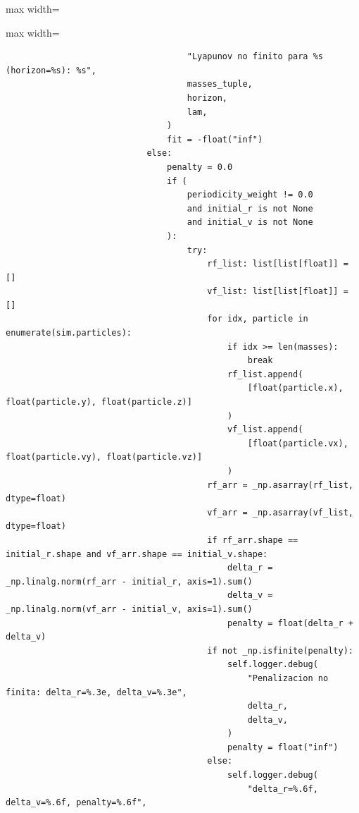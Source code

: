 \begin{listing}[H]
\begin{adjustbox}{max width=\textwidth}
\begin{minipage}{\linewidth}
{\begin{adjustbox}{max width=\textwidth}
\begin{minipage}{\textwidth}
\begin{verbatim}
                                    "Lyapunov no finito para %s (horizon=%s): %s",
                                    masses_tuple,
                                    horizon,
                                    lam,
                                )
                                fit = -float("inf")
                            else:
                                penalty = 0.0
                                if (
                                    periodicity_weight != 0.0
                                    and initial_r is not None
                                    and initial_v is not None
                                ):
                                    try:
                                        rf_list: list[list[float]] = []
                                        vf_list: list[list[float]] = []
                                        for idx, particle in enumerate(sim.particles):
                                            if idx >= len(masses):
                                                break
                                            rf_list.append(
                                                [float(particle.x), float(particle.y), float(particle.z)]
                                            )
                                            vf_list.append(
                                                [float(particle.vx), float(particle.vy), float(particle.vz)]
                                            )
                                        rf_arr = _np.asarray(rf_list, dtype=float)
                                        vf_arr = _np.asarray(vf_list, dtype=float)
                                        if rf_arr.shape == initial_r.shape and vf_arr.shape == initial_v.shape:
                                            delta_r = _np.linalg.norm(rf_arr - initial_r, axis=1).sum()
                                            delta_v = _np.linalg.norm(vf_arr - initial_v, axis=1).sum()
                                            penalty = float(delta_r + delta_v)
                                        if not _np.isfinite(penalty):
                                            self.logger.debug(
                                                "Penalizacion no finita: delta_r=%.3e, delta_v=%.3e",
                                                delta_r,
                                                delta_v,
                                            )
                                            penalty = float("inf")
                                        else:
                                            self.logger.debug(
                                                "delta_r=%.6f, delta_v=%.6f, penalty=%.6f",

\end{verbatim}
\end{minipage}
\end{adjustbox}}
\end{minipage}
\end{adjustbox}
\end{listing}
